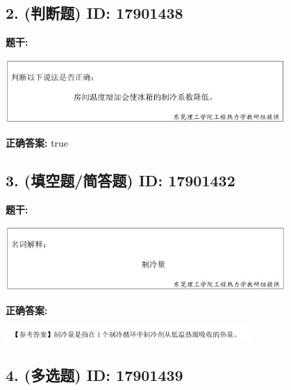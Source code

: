 \documentclass[12pt]{article}
\begin{document}
\subsection*{2. (判断题) \small ID: 17901438}

\textbf{题干:}


\begin{center}\includegraphics[width=0.8\textwidth, height=0.25\textheight, keepaspectratio]{question_2_17901438/title_img_1.png}\end{center}

\textbf{正确答案:}
true

\vspace{0.5em}\hrulefill\vspace{1em}

\subsection*{3. (填空题/简答题) \small ID: 17901432}

\textbf{题干:}


\begin{center}\includegraphics[width=0.8\textwidth, height=0.25\textheight, keepaspectratio]{question_3_17901432/title_img_1.png}\end{center}

\textbf{正确答案:}

\begin{center}\includegraphics[width=0.7\textwidth, height=0.2\textheight, keepaspectratio]{question_3_17901432/correct_answer_1_img_1.png}\end{center}

\vspace{0.5em}\hrulefill\vspace{1em}

\subsection*{4. (多选题) \small ID: 17901439}
\end{document}
